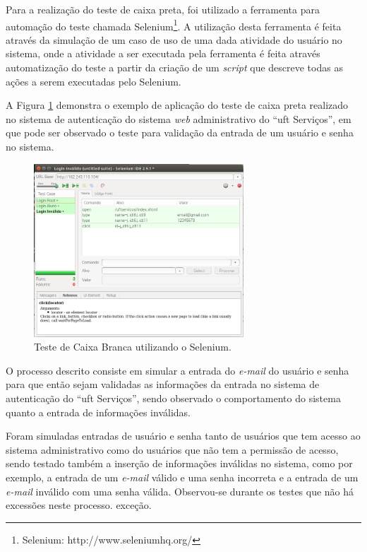 Para a realização do teste de caixa preta, foi utilizado a ferramenta para automação do teste chamada Selenium\footnote{Selenium: http://www.seleniumhq.org/}. A utilização desta ferramenta é feita através da simulação de um caso de uso de uma dada atividade do usuário no sistema, onde a atividade a ser executada pela ferramenta é feita através automatização do teste a partir da criação de um \textit{script} que descreve todas as ações a serem executadas pelo Selenium.

A Figura \ref{caixa_branca} demonstra o exemplo de aplicação do teste de caixa preta realizado no sistema de autenticação do sistema \textit{web} administrativo do ``\acrshort{uft} Serviços'', em que pode ser observado o teste para validação da entrada de um usuário e senha no sistema.

\begin{figure}[H]
  \centering
  \small
  \includegraphics[width=0.7\textwidth]{figuras/selenium_test.png} 
  \caption{Teste de Caixa Branca utilizando o Selenium.}
  \label{caixa_branca} 
\end{figure}

O processo descrito consiste em simular a entrada do \textit{e-mail} do usuário e senha para que então sejam validadas as informações da entrada no sistema de autenticação do ``\acrshort{uft} Serviços'', sendo observado o comportamento do sistema quanto a entrada de informações inválidas.

Foram simuladas entradas de usuário e senha tanto de usuários que tem acesso ao sistema administrativo como do usuários que não tem a permissão de acesso, sendo testado também a inserção de informações inválidas no sistema, como por exemplo, a entrada de um \textit{e-mail} válido e uma senha incorreta e a entrada de um \textit{e-mail} inválido com uma senha válida.  Observou-se durante os testes que não há excessões neste processo.  exceção.


